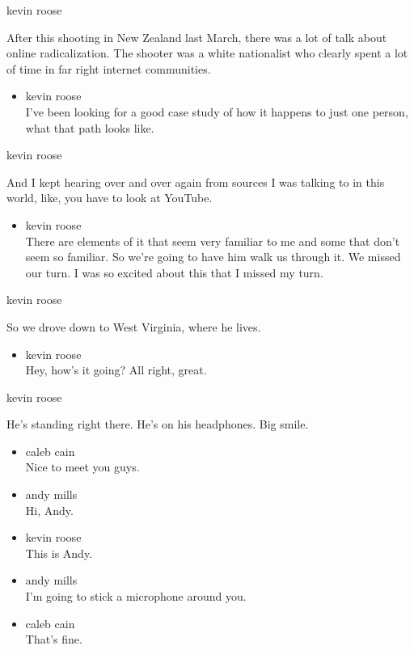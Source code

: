 kevin roose

After this shooting in New Zealand last March, there was a lot of talk
about online radicalization. The shooter was a white nationalist who
clearly spent a lot of time in far right internet communities.

\begin{itemize}
\tightlist
\item
  kevin roose\\
  I've been looking for a good case study of how it happens to just one
  person, what that path looks like.
\end{itemize}

kevin roose

And I kept hearing over and over again from sources I was talking to in
this world, like, you have to look at YouTube.

\begin{itemize}
\tightlist
\item
  kevin roose\\
  There are elements of it that seem very familiar to me and some that
  don't seem so familiar. So we're going to have him walk us through it.
  We missed our turn. I was so excited about this that I missed my turn.
\end{itemize}

kevin roose

So we drove down to West Virginia, where he lives.

\begin{itemize}
\tightlist
\item
  kevin roose\\
  Hey, how's it going? All right, great.
\end{itemize}

kevin roose

He's standing right there. He's on his headphones. Big smile.

\begin{itemize}
\item
  caleb cain\\
  Nice to meet you guys.
\item
  andy mills\\
  Hi, Andy.
\item
  kevin roose\\
  This is Andy.
\item
  andy mills\\
  I'm going to stick a microphone around you.
\item
  caleb cain\\
  That's fine.
\end{itemize}

